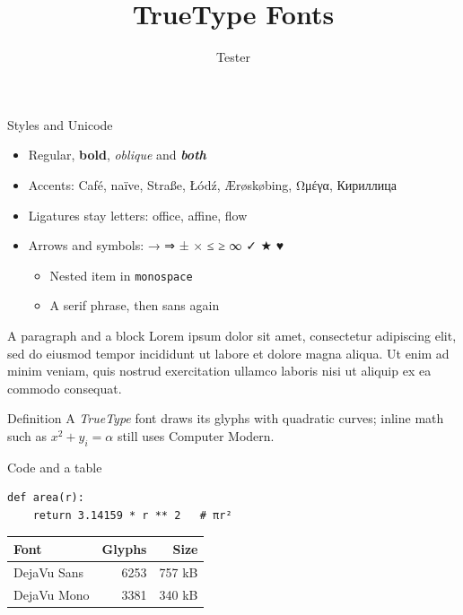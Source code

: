\documentclass[aspectratio=169]{beamer}
\title{TrueType Fonts}
\author{Tester}
\date{}
\begin{document}
\begin{frame}
  \titlepage
\end{frame}

\begin{frame}{Styles and Unicode}
  \begin{itemize}
    \item Regular, \textbf{bold}, \textit{oblique} and \textbf{\textit{both}}
    \item Accents: Café, naïve, Straße, Łódź, Ærøskøbing, Ωμέγα, Кириллица
    \item Ligatures stay letters: office, affine, flow
    \item Arrows and symbols: → ⇒ ± × ≤ ≥ ∞ ✓ ★ ♥
      \begin{itemize}
        \item Nested item in \texttt{monospace}
        \item {\rmfamily A serif phrase}, then sans again
      \end{itemize}
  \end{itemize}
\end{frame}

\begin{frame}{A paragraph and a block}
  Lorem ipsum dolor sit amet, consectetur adipiscing elit, sed do eiusmod tempor
  incididunt ut labore et dolore magna aliqua. Ut enim ad minim veniam, quis
  nostrud exercitation ullamco laboris nisi ut aliquip ex ea commodo consequat.

  \begin{block}{Definition}
    A \emph{TrueType} font draws its glyphs with quadratic curves; inline
    math such as $x^2 + y_i = \alpha$ still uses Computer Modern.
  \end{block}
\end{frame}

\begin{frame}[fragile]{Code and a table}
\begin{verbatim}
def area(r):
    return 3.14159 * r ** 2   # πr²
\end{verbatim}
  \begin{center}
    \begin{tabular}{lrr}
      \hline
      Font & Glyphs & Size \\
      \hline
      DejaVu Sans & 6253 & 757 kB \\
      DejaVu Mono & 3381 & 340 kB \\
      \hline
    \end{tabular}
  \end{center}
\end{frame}
\end{document}
